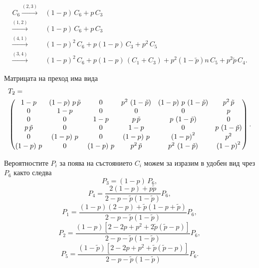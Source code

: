 \documentclass[a4paper,10pt]{article}
\begin{document}
%
\begin{equation}
\begin{split}
C_6 \xrightarrow{(2,3)}& (1-p)\,C_6 + p\,C_3\\
    \xrightarrow{(1,2)}& (1-p)\,C_6 + p\,C_3\\
    \xrightarrow{(4,1)}& (1-p)^2\,C_6 + p(1-p)\,C_3 + p^2\,C_5\\
    \xrightarrow{(3,4)}& (1-p)^2\,C_6 + p(1-p)\,(C_1 + C_3) + p^2(1-\tilde{p}) n \,C_5 + p^2\tilde{p}\,C_4.
\end{split}
\end{equation}

Матрицата на преход има вида
{\small
\begin{equation}
\begin{split}
&T_{2} = \\
&\begin{pmatrix}
 1-p & \left( 1-p\right) \,p\,\tilde{p} & 0 & {p}^{2}\,\left( 1-\tilde{p}\right)  & \left( 1-p\right) \,p\,\left( 1-\tilde{p}\right)  & {p}^{2}\,\tilde{p}\cr
 0 & 1-p & 0 & 0 & 0 & p\cr
 0 & 0 & 1-p & p\,\tilde{p} & p\,\left( 1-\tilde{p}\right)  & 0\cr
 p\,\tilde{p} & 0 & 0 & 1-p & 0 & p\,\left( 1-\tilde{p}\right) \cr
 0 & \left( 1-p\right) \,p & 0 & \left( 1-p\right) \,p & {\left( 1-p\right) }^{2} & {p}^{2}\cr
 \left( 1-p\right) \,p & 0 & \left( 1-p\right) \,p & {p}^{2}\,\tilde{p} & {p}^{2}\,\left( 1-\tilde{p}\right)  & {\left( 1-p\right) }^{2}
\end{pmatrix}.
\end{split}
\end{equation}
}


Вероятностите $P_i$ за поява на състоянието $C_i$ можем за изразим в удобен вид чрез $P_6$
както следва
\begin{equation}
 P_3 = (1-p)\,P_6,
\end{equation}
\begin{equation}
 P_4 = \frac{2(1-p) + p\tilde{p}}{2-p-\tilde{p}(1-\tilde{p})} P_6,
\end{equation}
\begin{equation}
 P_1 = \frac{(1-p)(2-p)+\tilde{p}(1-p+\tilde{p})}{2-p-\tilde{p}(1-\tilde{p})} P_6,
\end{equation}
\begin{equation}
 P_2 = \frac{(1-p)[2-2p+p^2+2\tilde{p}(\tilde{p}-p)]}{2-p-\tilde{p}(1-\tilde{p})} P_6,
\end{equation}
\begin{equation}
 P_5 = \frac{(1-\tilde{p})[2-2p+p^2+\tilde{p}(\tilde{p}-p)]}{2-p-\tilde{p}(1-\tilde{p})} P_6.
\end{equation}
%
%
%
%
\end{document}
